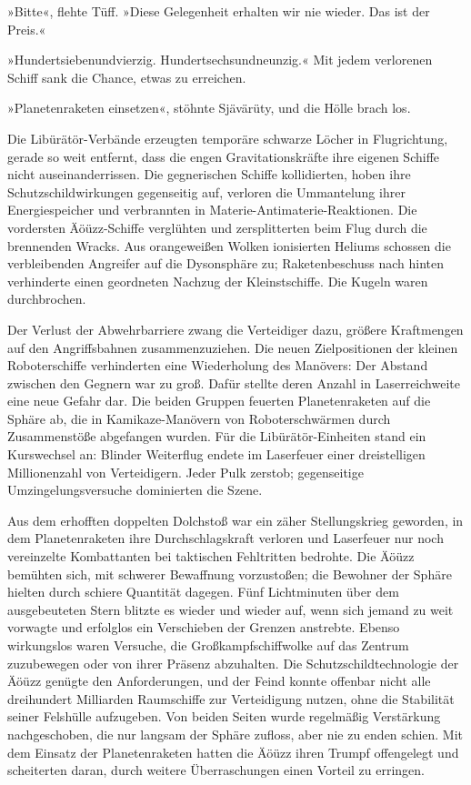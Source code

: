 »Bitte«, flehte Tüff. »Diese Gelegenheit erhalten wir nie wieder. Das ist der Preis.«

»Hundertsiebenundvierzig. Hundertsechsundneunzig.« Mit jedem verlorenen Schiff sank die Chance, etwas zu erreichen.

»Planetenraketen einsetzen«, stöhnte Sjävärüty, und die Hölle brach los.

Die Libürätör-Verbände erzeugten temporäre schwarze Löcher in Flugrichtung, gerade so weit entfernt, dass die engen Gravitationskräfte ihre eigenen Schiffe nicht auseinanderrissen. Die gegnerischen Schiffe kollidierten, hoben ihre Schutzschildwirkungen gegenseitig auf, verloren die Ummantelung ihrer Energiespeicher und verbrannten in Materie-Antimaterie-Reaktionen. Die vordersten Äöüzz-Schiffe verglühten und zersplitterten beim Flug durch die brennenden Wracks. Aus orangeweißen Wolken ionisierten Heliums schossen die verbleibenden Angreifer auf die Dysonsphäre zu; Raketenbeschuss nach hinten verhinderte einen geordneten Nachzug der Kleinstschiffe. Die Kugeln waren durchbrochen.

Der Verlust der Abwehrbarriere zwang die Verteidiger dazu, größere Kraftmengen auf den Angriffsbahnen zusammenzuziehen. Die neuen Zielpositionen der kleinen Roboterschiffe verhinderten eine Wiederholung des Manövers: Der Abstand zwischen den Gegnern war zu groß. Dafür stellte deren Anzahl in Laserreichweite eine neue Gefahr dar. Die beiden Gruppen feuerten Planetenraketen auf die Sphäre ab, die in Kamikaze-Manövern von Roboterschwärmen durch Zusammenstöße abgefangen wurden. Für die Libürätör-Einheiten stand ein Kurswechsel an: Blinder Weiterflug endete im Laserfeuer einer dreistelligen Millionenzahl von Verteidigern. Jeder Pulk zerstob; gegenseitige Umzingelungsversuche dominierten die Szene.

Aus dem erhofften doppelten Dolchstoß war ein zäher Stellungskrieg geworden, in dem Planetenraketen ihre Durchschlagskraft verloren und Laserfeuer nur noch vereinzelte Kombattanten bei taktischen Fehltritten bedrohte. Die Äöüzz bemühten sich, mit schwerer Bewaffnung vorzustoßen; die Bewohner der Sphäre hielten durch schiere Quantität dagegen. Fünf Lichtminuten über dem ausgebeuteten Stern blitzte es wieder und wieder auf, wenn sich jemand zu weit vorwagte und erfolglos ein Verschieben der Grenzen anstrebte. Ebenso wirkungslos waren Versuche, die Großkampfschiffwolke auf das Zentrum zuzubewegen oder von ihrer Präsenz abzuhalten. Die Schutzschildtechnologie der Äöüzz genügte den Anforderungen, und der Feind konnte offenbar nicht alle dreihundert Milliarden Raumschiffe zur Verteidigung nutzen, ohne die Stabilität seiner Felshülle aufzugeben. Von beiden Seiten wurde regelmäßig Verstärkung nachgeschoben, die nur langsam der Sphäre zufloss, aber nie zu enden schien. Mit dem Einsatz der Planetenraketen hatten die Äöüzz ihren Trumpf offengelegt und scheiterten daran, durch weitere Überraschungen einen Vorteil zu erringen.



